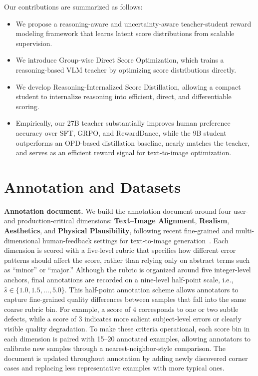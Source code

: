 \documentclass{llmxive}
\begin{document}
Our contributions are summarized as follows:

\begin{itemize}
    \item We propose a reasoning-aware and uncertainty-aware teacher-student reward modeling framework that learns latent score distributions from scalable supervision.

    \item We introduce Group-wise Direct Score Optimization, which trains a reasoning-based VLM teacher by optimizing score distributions directly.

    \item We develop Reasoning-Internalized Score Distillation, allowing a compact student to internalize reasoning into efficient, direct, and differentiable scoring.

    \item Empirically, our 27B teacher substantially improves human preference accuracy over SFT, GRPO, and RewardDance, while the 9B student outperforms an OPD-based distillation baseline, nearly matches the teacher, and serves as an efficient reward signal for text-to-image optimization.

\end{itemize}

\section{Annotation and Datasets}
\label{sec:annotation_and_datasets}

\textbf{Annotation document.} We build the annotation document around four user- and production-critical dimensions: \textbf{Text--Image Alignment}, \textbf{Realism}, \textbf{Aesthetics}, and \textbf{Physical Plausibility}, following recent fine-grained and multi-dimensional human-feedback settings for text-to-image generation~\cite{liang2024rich,zhang2024learning_mps}. Each dimension is scored with a five-level rubric that specifies how different error patterns should affect the score, rather than relying only on abstract terms such as ``minor'' or ``major.'' Although the rubric is organized around five integer-level anchors, final annotations are recorded on a nine-level half-point scale, i.e., 
$\hat{s}\in\{1.0,1.5,\ldots,5.0\}$. 
This half-point annotation scheme allows annotators to capture fine-grained quality differences between samples that fall into the same coarse rubric bin. For example, a score of 4 corresponds to one or two subtle defects, while a score of 3 indicates more salient subject-level errors or clearly visible quality degradation. To make these criteria operational, each score bin in each dimension is paired with 15--20 annotated examples, allowing annotators to calibrate new samples through a nearest-neighbor-style comparison. The document is updated throughout annotation by adding newly discovered corner cases and replacing less representative examples with more typical ones.
\end{document}

